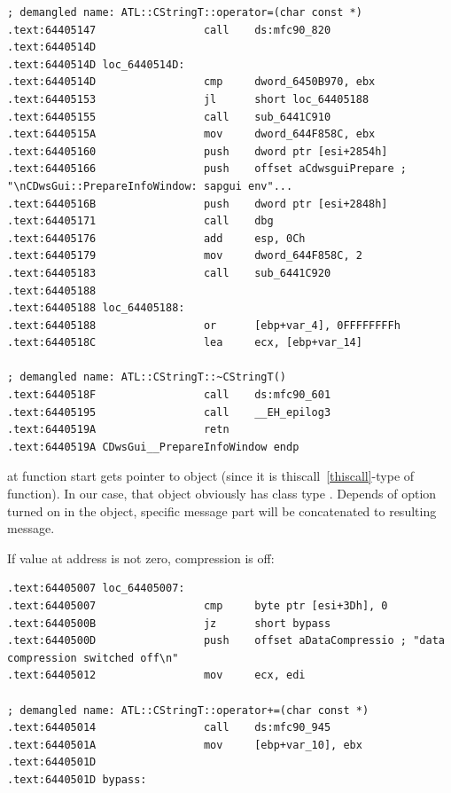 \begin{lstlisting}
; demangled name: ATL::CStringT::operator=(char const *)
.text:64405147                 call    ds:mfc90_820
.text:6440514D
.text:6440514D loc_6440514D:
.text:6440514D                 cmp     dword_6450B970, ebx
.text:64405153                 jl      short loc_64405188
.text:64405155                 call    sub_6441C910
.text:6440515A                 mov     dword_644F858C, ebx
.text:64405160                 push    dword ptr [esi+2854h]
.text:64405166                 push    offset aCdwsguiPrepare ; "\nCDwsGui::PrepareInfoWindow: sapgui env"...
.text:6440516B                 push    dword ptr [esi+2848h]
.text:64405171                 call    dbg
.text:64405176                 add     esp, 0Ch
.text:64405179                 mov     dword_644F858C, 2
.text:64405183                 call    sub_6441C920
.text:64405188
.text:64405188 loc_64405188:
.text:64405188                 or      [ebp+var_4], 0FFFFFFFFh
.text:6440518C                 lea     ecx, [ebp+var_14]

; demangled name: ATL::CStringT::~CStringT()
.text:6440518F                 call    ds:mfc90_601
.text:64405195                 call    __EH_epilog3
.text:6440519A                 retn
.text:6440519A CDwsGui__PrepareInfoWindow endp
\end{lstlisting}

{\ECX at function start gets pointer to object (since it is thiscall~\ref{thiscall}-type of function).
In our case, that object obviously has class type . 
Depends of option turned on in the object, specific message part will be concatenated to resulting message.}

{If value at  address is not zero, compression is off}:

\begin{lstlisting}
.text:64405007 loc_64405007:
.text:64405007                 cmp     byte ptr [esi+3Dh], 0
.text:6440500B                 jz      short bypass
.text:6440500D                 push    offset aDataCompressio ; "data compression switched off\n"
.text:64405012                 mov     ecx, edi

; demangled name: ATL::CStringT::operator+=(char const *)
.text:64405014                 call    ds:mfc90_945
.text:6440501A                 mov     [ebp+var_10], ebx
.text:6440501D
.text:6440501D bypass:
\end{lstlisting}


